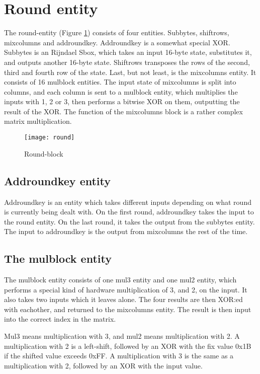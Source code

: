 \section{Round entity}
The round-entity (Figure \ref{block:round}) consists of four entities. 
Subbytes, shiftrows, mixcolumns and addroundkey. Addroundkey is a 
somewhat special XOR. Subbytes is an Rijndael Sbox, which takes an 
input 16-byte state, substitutes it, and outputs another 16-byte state. 
Shiftrows transposes the rows of the second, third and fourth row of 
the state. Last, but not least, is the mixcolumns entity. It consists 
of 16 mulblock entities. The input state of mixcolumns is split into 
columns, and each column is sent to a mulblock entity, which multiplies 
the inputs with 1, 2 or 3, then performs a bitwise XOR on them, 
outputting the result of the XOR. The function of the mixcolumns block 
is a rather complex matrix multiplication.

\begin{figure}[h!]
  \centering
  \texttt{[image: round]}
  \caption{Round-block}
  \label{block:round}
\end{figure}

\subsection{Addroundkey entity}
Addroundkey is an entity which takes different inputs depending on 
what round is currently being dealt with. On the first round, 
addroundkey takes the input to the round entity. On the last round, it 
takes the output from the subbytes entity. The input to addroundkey is 
the output from mixcolumns the rest of the time.

\subsection{The mulblock entity}
The mulblock entity consists of one mul3 entity and one mul2 entity, 
which performs a special kind of hardware multiplication of 3, and 2, 
on the input. It also takes two inputs which it leaves alone. The four 
results are then XOR:ed with eachother, and returned to the mixcolumns 
entity. The result is then input into the correct index in the matrix. 

Mul3 means multiplication with 3, and mul2 means multiplication with 2. 
A multiplication with 2 is a left-shift, followed by an XOR with the 
fix value 0x1B if the shifted value exceeds 0xFF. A multiplication with 
3 is the same as a multiplication with 2, followed by an XOR with the 
input value.
